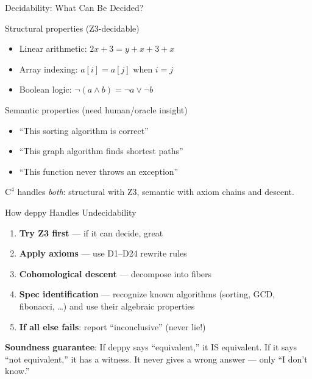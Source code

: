 \documentclass[aspectratio=169,11pt]{beamer}
\newcommand{\Cfour}{\mathrm{C}^4}
\begin{document}
\begin{frame}{Decidability: What Can Be Decided?}
\begin{block}{Structural properties (Z3-decidable)}
\begin{itemize}
\item Linear arithmetic: $2x + 3 = y + x + 3 + x$
\item Array indexing: $a[i] = a[j]$ when $i = j$
\item Boolean logic: $\neg(a \land b) = \neg a \lor \neg b$
\end{itemize}
\end{block}

\begin{block}{Semantic properties (need human/oracle insight)}
\begin{itemize}
\item ``This sorting algorithm is correct''
\item ``This graph algorithm finds shortest paths''
\item ``This function never throws an exception''
\end{itemize}
\end{block}

$\Cfour$ handles \emph{both}: structural with Z3, semantic with
axiom chains and descent.
\end{frame}

\begin{frame}{How deppy Handles Undecidability}
\begin{enumerate}
\item \textbf{Try Z3 first} --- if it can decide, great
\item \textbf{Apply axioms} --- use D1--D24 rewrite rules
\item \textbf{Cohomological descent} --- decompose into fibers
\item \textbf{Spec identification} --- recognize known algorithms
  (sorting, GCD, fibonacci, \ldots) and use their algebraic properties
\item \textbf{If all else fails}: report ``inconclusive'' (never lie!)
\end{enumerate}

\vspace{0.5em}
\textbf{Soundness guarantee}: If deppy says ``equivalent,'' it IS
equivalent. If it says ``not equivalent,'' it has a witness.
It never gives a wrong answer --- only ``I don't know.''
\end{frame}
\end{document}
